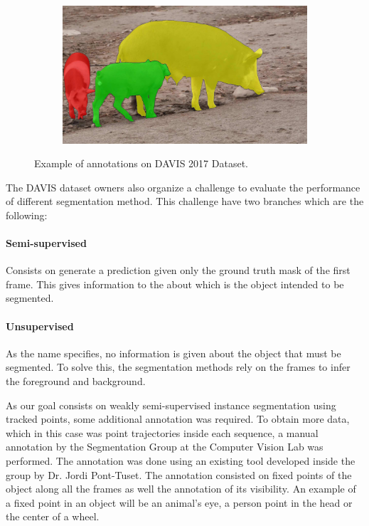 \begin{figure}[h]
\begin{subfigure}{.25\textwidth}
  \end{subfigure}%
  \begin{subfigure}{.25\textwidth}
    \includegraphics[width=1.\linewidth]{figures/davis_dataset/image_4.jpg}
  \end{subfigure}
  \caption{Example of annotations on DAVIS 2017 Dataset.}
  \label{fig:davis}
\end{figure}


The DAVIS dataset owners also organize a challenge to evaluate the performance of different segmentation method.
This challenge have two branches which are the following:

\paragraph{Semi-supervised}

Consists on generate a prediction given only the ground truth mask of the first frame.
This gives information to the about which is the object intended to be segmented.

\paragraph{Unsupervised}

As the name specifies, no information is given about the object that must be segmented.
To solve this, the segmentation methods rely on the frames to infer the foreground and background.

As our goal consists on weakly semi-supervised instance segmentation using tracked points, some additional annotation was required.
To obtain more data, which in this case was point trajectories inside each sequence, a manual annotation by the Segmentation Group at the Computer Vision Lab was performed.
The annotation was done using an existing tool developed inside the group by Dr. Jordi Pont-Tuset.
The annotation consisted on fixed points of the object along all the frames as well the annotation of its visibility.
An example of a fixed point in an object will be an animal's eye, a person point in the head or the center of a wheel.

